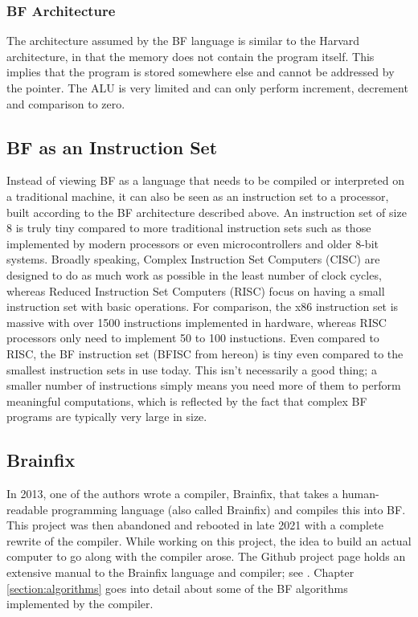 \subsubsection{BF Architecture}
The architecture assumed by the BF language is similar to the Harvard architecture, in that the memory does not contain the program itself. This implies that the program is stored somewhere else and cannot be addressed by the pointer. The ALU is very limited and can only perform increment, decrement and comparison to zero.


\subsection{BF as an Instruction Set}
Instead of viewing BF as a language that needs to be compiled or interpreted on a traditional machine, it can also be seen as an instruction set to a processor, built according to the BF architecture described above. An instruction set of size 8 is truly tiny compared to more traditional instruction sets such as those implemented by modern processors or even microcontrollers and older 8-bit systems. Broadly speaking, Complex Instruction Set Computers (CISC) are designed to do as much work as possible in the least number of clock cycles, whereas Reduced Instruction Set Computers (RISC) focus on having a small instruction set with basic operations. For comparison, the x86 instruction set is massive with over 1500 instructions implemented in hardware, whereas RISC processors only need to implement 50 to 100 instuctions. Even compared to RISC, the BF instruction set (BFISC from hereon) is tiny even compared to the smallest instruction sets in use today. This isn't necessarily a good thing; a smaller number of instructions simply means you need more of them to perform meaningful computations, which is reflected by the fact that complex BF programs are typically very large in size.

\subsection{Brainfix}
In 2013, one of the authors wrote a compiler, Brainfix, that takes a human-readable programming language (also called Brainfix) and compiles this into BF. This project was then abandoned and rebooted in late 2021 with a complete rewrite of the compiler. While working on this project, the idea to build an actual computer to go along with the compiler arose. The Github project page holds an extensive manual to the Brainfix language and compiler; see \cite{brainfix}. Chapter \ref{section:algorithms} goes into detail about some of the BF algorithms implemented by the compiler.

